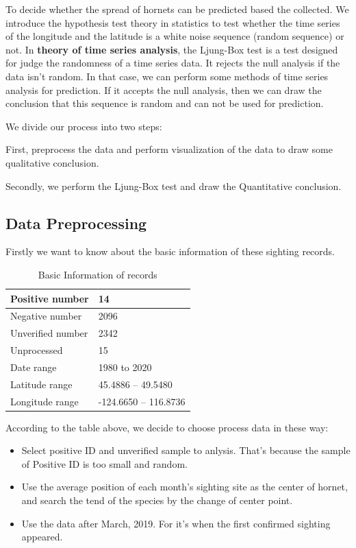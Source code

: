 \documentclass[12pt]{article}
\begin{document}
To decide whether the spread of hornets can be predicted based the collected. We introduce the hypothesis test theory in statistics to test whether the time series of the longitude and the latitude is a white noise sequence (random sequence) or not. In \textbf{theory of time series analysis}, the Ljung-Box test is a test designed for judge the randomness of a time series data. It rejects  the null analysis if the data isn’t random. In that case, we can perform some methods of time series analysis for prediction. If it accepts the null analysis, then we can draw the conclusion that this sequence is random and can not be used for prediction.

We divide our process into two steps: 

First, preprocess the data and perform visualization of the data to draw some qualitative conclusion.

Secondly, we perform the Ljung-Box test and draw the Quantitative conclusion.

\subsection{Data Preprocessing}
Firstly we want to know about the basic information of these sighting records.
\begin{table}[H]
	\caption{Basic Information of records}  
	\small
	\begin{center}  
		\begin{tabular}{|m{7cm}<{\centering}|m{7cm}<{\centering}|}  
			\hline  
			Positive number & 14  \\ \hline  
			Negative number& 2096\\ \hline  
			Unverified number &2342 \\  
			\hline 
			Unprocessed & 15 \\  
			\hline  
			Date range &1980   to   2020 \\  
			\hline
		    Latitude range & 45.4886  --   49.5480\\  
			\hline
			Longitude range & -124.6650   --  116.8736\\  
			\hline
		\end{tabular}  
	\end{center}  
\end{table}

According to the table above, we decide to choose process data in these way:
\begin{itemize}
	\item Select positive ID and unverified sample to anlysis. That's because the sample of Positive ID is too small and  random.
	\item Use the average position of each month's sighting site as the center of hornet, and search the tend of the species by the change of center point.
	\item Use the data after March, 2019. For it's when the first confirmed sighting appeared.
\end{itemize}
\end{document}
